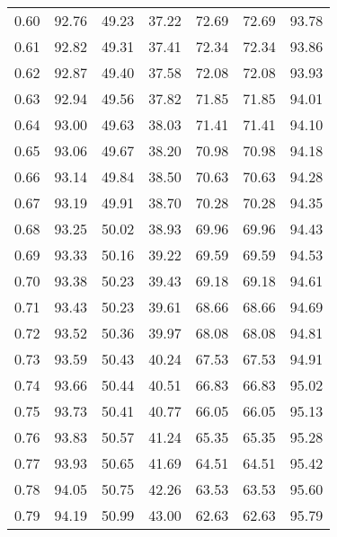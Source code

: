 \begin{tabular}{|c|c|c|c|c|c|c|}
      0.60 &     92.76 &     49.23 &      37.22 &   72.69 &      72.69 &         93.78 \\
      0.61 &     92.82 &     49.31 &      37.41 &   72.34 &      72.34 &         93.86 \\
      0.62 &     92.87 &     49.40 &      37.58 &   72.08 &      72.08 &         93.93 \\
      0.63 &     92.94 &     49.56 &      37.82 &   71.85 &      71.85 &         94.01 \\
      0.64 &     93.00 &     49.63 &      38.03 &   71.41 &      71.41 &         94.10 \\
      0.65 &     93.06 &     49.67 &      38.20 &   70.98 &      70.98 &         94.18 \\
      0.66 &     93.14 &     49.84 &      38.50 &   70.63 &      70.63 &         94.28 \\
      0.67 &     93.19 &     49.91 &      38.70 &   70.28 &      70.28 &         94.35 \\
      0.68 &     93.25 &     50.02 &      38.93 &   69.96 &      69.96 &         94.43 \\
      0.69 &     93.33 &     50.16 &      39.22 &   69.59 &      69.59 &         94.53 \\
      0.70 &     93.38 &     50.23 &      39.43 &   69.18 &      69.18 &         94.61 \\
      0.71 &     93.43 &     50.23 &      39.61 &   68.66 &      68.66 &         94.69 \\
      0.72 &     93.52 &     50.36 &      39.97 &   68.08 &      68.08 &         94.81 \\
      0.73 &     93.59 &     50.43 &      40.24 &   67.53 &      67.53 &         94.91 \\
      0.74 &     93.66 &     50.44 &      40.51 &   66.83 &      66.83 &         95.02 \\
      0.75 &     93.73 &     50.41 &      40.77 &   66.05 &      66.05 &         95.13 \\
      0.76 &     93.83 &     50.57 &      41.24 &   65.35 &      65.35 &         95.28 \\
      0.77 &     93.93 &     50.65 &      41.69 &   64.51 &      64.51 &         95.42 \\
      0.78 &     94.05 &     50.75 &      42.26 &   63.53 &      63.53 &         95.60 \\
      0.79 &     94.19 &     50.99 &      43.00 &   62.63 &      62.63 &         95.79 \\

\end{tabular}

